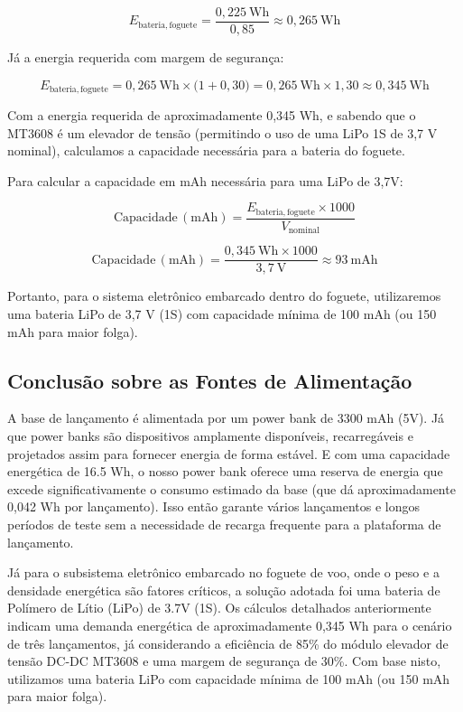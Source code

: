 \begin{equation}
E_{\mathrm{bateria,foguete}}
=
\frac{0{,}225~\mathrm{Wh}}{0{,}85}
\approx
0{,}265~\mathrm{Wh}
\end{equation}

Já a energia requerida com margem de segurança:

\begin{equation}
E_{\mathrm{bateria,foguete}}
=
0{,}265~\mathrm{Wh}
\times
\bigl(1 + 0{,}30\bigr)
=
0{,}265~\mathrm{Wh}
\times
1{,}30
\approx
0{,}345~\mathrm{Wh}
\end{equation}

Com a energia requerida de aproximadamente 0,345 Wh, e sabendo que o MT3608 é um elevador de tensão (permitindo o uso de uma LiPo 1S de 3,7 V nominal), calculamos a capacidade necessária para a bateria do foguete.

Para calcular a capacidade em mAh necessária para uma LiPo de 3,7V:

\begin{equation}
\mathrm{Capacidade\,(mAh)}
=
\frac{E_{\mathrm{bateria,foguete}} \times 1000}{V_{\mathrm{nominal}}}
\end{equation}

\begin{equation}
\mathrm{Capacidade\,(mAh)}
=
\frac{0{,}345~\mathrm{Wh} \times 1000}{3{,}7~\mathrm{V}}
\approx
93~\mathrm{mAh}
\end{equation}

Portanto, para o sistema eletrônico embarcado dentro do foguete, utilizaremos uma bateria LiPo de 3,7 V (1S) com capacidade mínima de 100 mAh (ou 150 mAh para maior folga).

\subsection{Conclusão sobre as Fontes de Alimentação}

A base de lançamento é alimentada por um power bank de 3300 mAh (5V). Já que power banks são dispositivos amplamente disponíveis, recarregáveis e projetados assim para fornecer energia de forma estável. E com uma capacidade energética de 16.5 Wh, o nosso power bank oferece uma reserva de energia que excede significativamente o consumo estimado da base (que dá aproximadamente 0,042 Wh por lançamento). Isso então garante vários lançamentos e longos períodos de teste sem a necessidade de recarga frequente para a plataforma de lançamento. 

Já para o subsistema eletrônico embarcado no foguete de voo, onde o peso e a densidade energética são fatores críticos, a solução adotada foi uma bateria de Polímero de Lítio (LiPo) de 3.7V (1S). Os cálculos detalhados anteriormente indicam uma demanda energética de aproximadamente 0,345 Wh para o cenário de três lançamentos, já considerando a eficiência de 85\% do módulo elevador de tensão DC-DC MT3608 e uma margem de segurança de 30\%. Com base nisto, utilizamos uma bateria LiPo com capacidade mínima de 100 mAh (ou 150 mAh para maior folga).